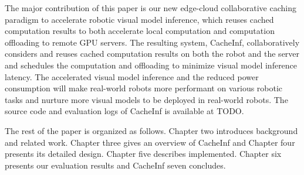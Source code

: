 The major contribution of this paper is our new edge-cloud collaborative caching paradigm to accelerate robotic visual model inference, which reuses cached computation results to both accelerate local computation and computation offloading to remote GPU servers.
The resulting system, CacheInf, collaboratively considers and reuses cached computation results on both the robot and the server and schedules the computation and offloading to minimize visual model inference latency.
The accelerated visual model inference and the reduced power consumption will make real-world robots more performant on various robotic tasks and nurture more visual models to be deployed in real-world robots.
The source code and evaluation logs of CacheInf is available at TODO.

The rest of the paper is organized as follows.
Chapter two introduces background and related work.
Chapter three gives an overview of CacheInf and Chapter four presents its detailed design.
Chapter five describes implemented.
Chapter six presents our evaluation results and CacheInf seven concludes.

